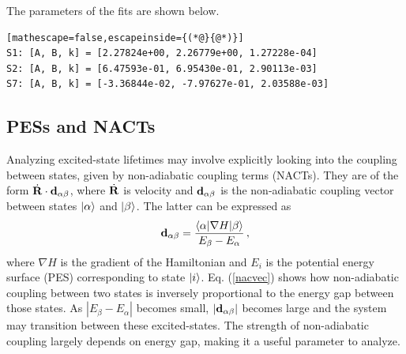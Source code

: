 \documentclass[letterpaper,12pt,titlepage]{article}
\begin{document}
The parameters of the fits are shown below.
\begin{lstlisting}[mathescape=false,escapeinside={(*@}{@*)}]
S1: [A, B, k] = [2.27824e+00, 2.26779e+00, 1.27228e-04]
S2: [A, B, k] = [6.47593e-01, 6.95430e-01, 2.90113e-03]
S7: [A, B, k] = [-3.36844e-02, -7.97627e-01, 2.03588e-03]
\end{lstlisting}

\subsection{PESs and NACTs}
Analyzing excited-state lifetimes may involve explicitly looking into the coupling between states, given by non-adiabatic coupling terms (NACTs).  They are of the form $\dot{{\bf{R}}}\cdot {\bf{d}}_{\alpha\beta}$, where $\dot{{\bf{R}}}$ is velocity and ${\bf{d}}_{\alpha\beta}$ is the non-adiabatic coupling vector between states $\ket{\alpha}$ and $\ket{\beta}$.  The latter can be expressed as
\begin{equation}
\label{nacvec}
{\bf{d}}_{\alpha\beta} = \frac{\left<\alpha|\nabla H|\beta\right>}{E_{\beta}-E_{\alpha}}\,,
\end{equation}
where $\nabla H$ is the gradient of the Hamiltonian and $E_{i}$ is the potential energy surface (PES) corresponding to state $\ket{i}$.  Eq. (\ref{nacvec}) shows how non-adiabatic coupling between two states is inversely proportional to the energy gap between those states.  As $|E_{\beta}-E_{\alpha}|$ becomes small, $|{\bf{d}}_{\alpha\beta}|$ becomes large and the system may transition between these excited-states.  The strength of non-adiabatic coupling largely depends on energy gap, making it a useful parameter to analyze.
\end{document}
